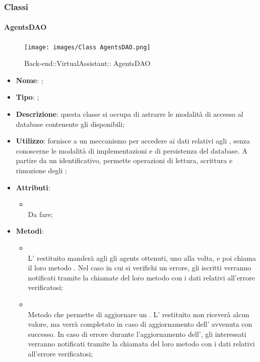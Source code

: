\subsubsection{Classi}
\hypertarget{ AgentsDAO_label}{\paragraph{ AgentsDAO}}
\begin{figure}[h]
	\centering
	\texttt{[image: images/Class AgentsDAO.png]}
	\caption{Back-end::VirtualAssistant:: AgentsDAO}
\end{figure}
\begin{itemize}
	\item \textbf{Nome}: ;
	\item \textbf{Tipo}: ;
	\item \textbf{Descrizione}: questa classe si occupa di astrarre le modalità di accesso al database contenente gli  disponibili;
	\item \textbf{Utilizzo}: fornisce a  un meccanismo per accedere ai dati relativi agli , senza conoscerne le modalità di implementazioni e di persistenza del database. A partire da un identificativo, permette operazioni di lettura, scrittura e rimozione degli ;
	\item \textbf{Attributi}:
	\begin{itemize}
		\item[]  \\
		Da fare;
	\end{itemize}
	\item \textbf{Metodi}:
	\begin{itemize}
		\item[]  \\
		L' restituito manderà agli  gli agents ottenuti, uno alla volta, e poi chiama il loro metodo . Nel caso in cui si verifichi un errore, gli  iscritti verranno notificati tramite la chiamate del loro metodo  con i dati relativi all'errore verificatosi;\\
		\item[]  \\
		Metodo che permette di aggiornare un .  L' restituito non riceverà alcun valore, ma verrà completato in caso di aggiornamento dell' avvenuta con successo. In caso di errore durante l'aggiornamento dell', gli  interessati verranno notificati tramite la chiamata del loro metodo  con i dati relativi all'errore verificatosi;\\

\end{itemize}
\end{itemize}
